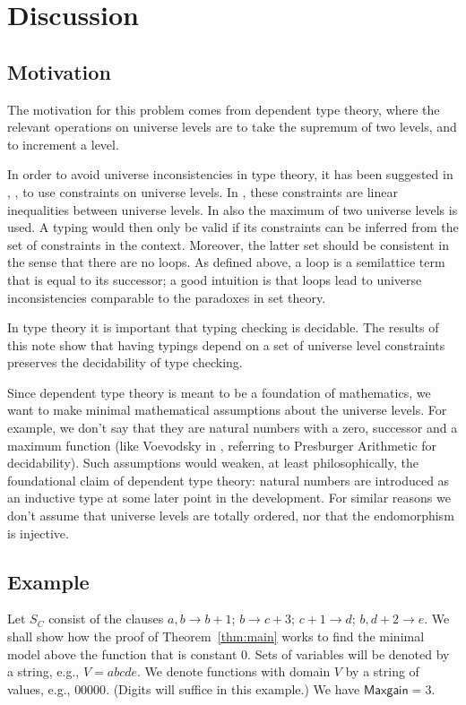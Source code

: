 \documentclass[11pt,a4paper]{article}
\newcommand\M{\mathsf{Maxgain}}
\begin{document}
\section{Discussion}\label{sec:discussion}

\subsection{Motivation}

The motivation for this problem comes from dependent type theory, 
where the relevant operations on universe levels are to take the
supremum of two levels, and to increment a level.

In order to avoid universe inconsistencies in type theory, 
it has been suggested in \cite{Huet87}, \cite{HarperP91}, \cite{VV}
to use constraints on universe levels.
In \cite{Huet87}, \cite{HarperP91} these constraints
are linear inequalities between universe levels.
In \cite{VV} also the maximum of two universe levels is used.
A typing would then
only be valid if its constraints can be inferred from the set
of constraints in the context. 
Moreover, the latter set should
be consistent in the sense that there are no loops. 
As defined above, a loop is a semilattice term that is equal to its successor; 
a good intuition is that loops lead to universe inconsistencies 
comparable to the paradoxes in set theory.

In type theory it is important that typing checking is decidable.
The results of this note show that having typings depend
on a set of universe level constraints preserves the decidability
of type checking.

Since dependent type theory is meant to be a foundation of mathematics,
we want to make minimal mathematical assumptions about the universe levels.
For example, we don't say that they are natural numbers
with a zero, successor and a maximum function (like Voevodsky in \cite{VV},
referring to Presburger Arithmetic for decidability).
Such assumptions would weaken, at least philosophically,
the foundational claim of dependent type theory:
natural numbers are introduced as an inductive type
at some later point in the development. For similar reasons
we don't assume that universe levels are totally ordered,
nor that the endomorphism is injective.

\subsection{Example}
Let $S_C$ consist of the clauses 
$a,b\to b+1$; $b\to c+3$; $c+1\to d$; $b,d+2\to e$.
We shall show how the proof of Theorem~\ref{thm:main} works to find the 
minimal model above the function that is constant $0$.
Sets of variables will be denoted by a string, e.g., $V=abcde$. 
We denote functions with domain $V$ by a string of values, e.g., $00000$.
(Digits will suffice in this example.) We have $\M=3$.
\end{document}
